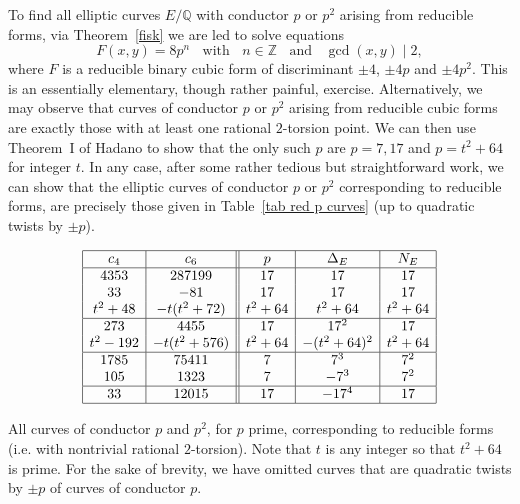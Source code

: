 To find all elliptic curves $E/\mathbb{Q}$ with conductor $p$ or $p^2$ arising from reducible forms, 
via Theorem~\ref{fisk} we are led to solve equations
\begin{equation} \label{loaf}
 F(x,y)=8 p^n \; \; \mbox{ with } \; \;  n \in \mathbb{Z} \; \; \mbox{ and } \; \; \gcd(x,y) \mid 2,
\end{equation}
where $F$ is a reducible binary cubic form of discriminant $\pm 4$, $\pm 4p$ and $\pm 4 p^2$. 
This is an essentially elementary, though rather painful, exercise. Alternatively, we may observe that curves of 
conductor $p$ or $p^2$ arising from reducible cubic forms are exactly those with at least one rational $2$-torsion 
point. We can then use Theorem~I of Hadano \cite{Had} to show that the only such $p$ are $p=7, 17$ and $p=t^2+64$ for 
integer $t$.
In any case, after some rather tedious but straightforward work, we can show that the elliptic curves  of conductor $p$ 
or $p^2$ corresponding to reducible forms, are precisely those given in Table~\ref{tab red p curves} (up to quadratic 
twists by $\pm p$). 

\begin{table}
$$
\begin{array}{|c|c||c|c|c|} \hline
  c_4 & c_6 & p & \Delta_E & N_E \\ \hline
 4353 & 287199 & 17 & 17 & 17 \\
 33 & -81 & 17 & 17 & 17 \\
 t^2+48 & -t (t^2+72) & t^2+64 & t^2+64 &  t^2+64 \\ \hline
  273 & 4455 & 17 & 17^2 & 17 \\
 t^2-192 &  -t(t^2+576) & t^2+64 & -(t^2+64)^2 &  t^2+64 \\
\hline
 1785 & 75411 & 7 & 7^3 & 7^2 \\
 105 & 1323 & 7 & -7^3 & 7^2 \\
 \hline
 33 & 12015 & 17 & -17^4 & 17 \\
\hline
\end{array}
$$
\caption{All curves of conductor $p$ and $p^2$, for $p$ prime,  corresponding to reducible forms (i.e. with nontrivial rational $2$-torsion). Note 
that $t$ is any integer so that $t^2+64$ is prime. For the sake of brevity, we have omitted curves that are quadratic 
twists by $\pm p$ of curves of conductor $p$. }\label{tab red p 
curves}
\end{table}



